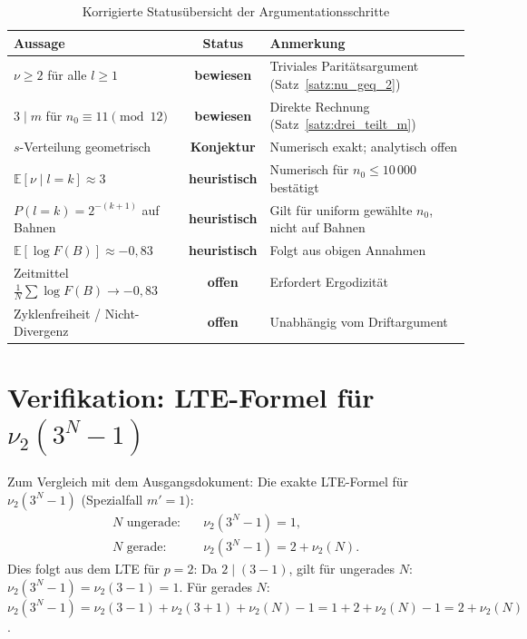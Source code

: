 \documentclass[12pt,a4paper]{article}
\newcommand{\vii}{\nu_2}
\newcommand{\E}{\mathbb{E}}
\newcommand{\logF}{\log F(B)}
\begin{document}
\begin{table}[h!]
\centering
\caption{Korrigierte Statusübersicht der Argumentationsschritte}
\label{tab:status_korr}
\renewcommand{\arraystretch}{1.4}
\begin{tabular}{p{5.5cm} c p{6.5cm}}
\toprule
\textbf{Aussage} & \textbf{Status} & \textbf{Anmerkung} \\
\midrule
$\nu \geq 2$ für alle $l \geq 1$
  & \textcolor{bewiesengrün}{\textbf{bewiesen}}
  & Triviales Paritätsargument (Satz~\ref{satz:nu_geq_2}) \\
$3 \mid m$ für $n_0 \equiv 11 \pmod{12}$
  & \textcolor{bewiesengrün}{\textbf{bewiesen}}
  & Direkte Rechnung (Satz~\ref{satz:drei_teilt_m}) \\
$s$-Verteilung geometrisch
  & \textcolor{warnorange}{\textbf{Konjektur}}
  & Numerisch exakt; analytisch offen \\
$\E[\nu \mid l{=}k] \approx 3$
  & \textcolor{warnorange}{\textbf{heuristisch}}
  & Numerisch für $n_0 \leq 10\,000$ bestätigt \\
$P(l{=}k) = 2^{-(k+1)}$ auf Bahnen
  & \textcolor{warnorange}{\textbf{heuristisch}}
  & Gilt für uniform gewählte $n_0$, nicht auf Bahnen \\
$\E[\logF] \approx -0{,}83$
  & \textcolor{warnorange}{\textbf{heuristisch}}
  & Folgt aus obigen Annahmen \\
Zeitmittel $\frac{1}{N}\sum \logF \to -0{,}83$
  & \textcolor{lückenrot}{\textbf{offen}}
  & Erfordert Ergodizität \\
Zyklenfreiheit / Nicht-Divergenz
  & \textcolor{lückenrot}{\textbf{offen}}
  & Unabhängig vom Driftargument \\
\bottomrule
\end{tabular}
\end{table}

\appendix
\section{Verifikation: LTE-Formel für \texorpdfstring{$\vii(3^N - 1)$}{nu2(3^N-1)}}
\label{app:lte}

Zum Vergleich mit dem Ausgangsdokument: Die exakte LTE-Formel für
$\vii(3^N - 1)$ (Spezialfall $m' = 1$):
\begin{align*}
  N \text{ ungerade:} &\quad \vii(3^N - 1) = 1, \\
  N \text{ gerade:}   &\quad \vii(3^N - 1) = 2 + \vii(N).
\end{align*}
Dies folgt aus dem LTE für $p=2$: Da $2 \mid (3-1)$, gilt für ungerades $N$:
$\vii(3^N - 1) = \vii(3-1) = 1$.
Für gerades $N$: $\vii(3^N - 1) = \vii(3-1) + \vii(3+1) + \vii(N) - 1 = 1 + 2 + \vii(N) - 1 = 2 + \vii(N)$.
\end{document}
